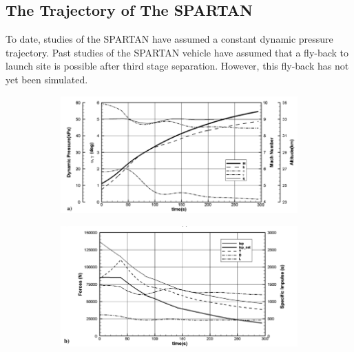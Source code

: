 \subsection{The Trajectory of The SPARTAN}

To date, studies of the SPARTAN have assumed a constant dynamic pressure trajectory\cite{Preller2017}.
Past studies of the SPARTAN vehicle have assumed that a fly-back to launch site is possible after third stage separation\cite{Preller2017}. However, this fly-back has not yet been simulated. 

	\begin{figure}[ht]
		\begin{subfigure}{.8\textwidth}
		\centering
		\includegraphics[width=0.99\linewidth]{figures/2_literature-review/SPARTAN_traj1}

		\label{fig:SPARTAN_traj1}
	\end{subfigure}
	\begin{subfigure}{.8\textwidth}
		\centering
		\includegraphics[width=0.99\linewidth]{figures/2_literature-review/SPARTAN_traj2}


\end{subfigure}
\end{figure}
